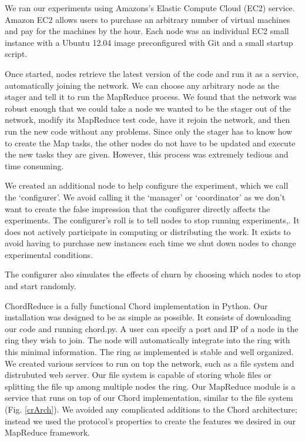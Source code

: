 \documentclass[10pt, conference, compsocconf]{IEEEtran}
\begin{document}
We ran our experiments using Amazons's Elastic Compute Cloud (EC2) service.  Amazon EC2 allows users to purchase an arbitrary number of virtual machines and pay for the machines by the hour. Each node was an individual EC2 small instance \cite{amazon-instances} with a Ubuntu 12.04 image preconfigured with Git and a small startup script.  

Once started, nodes retrieve the latest version of the code and run it as a service, automatically joining the network.  We can choose any arbitrary node as the stager and tell it to run the MapReduce process. We found that the network was robust enough that we could take a node we wanted to be the stager out of the network, modify its MapReduce test code, have it rejoin the network, and then run the new code without any problems. Since only the stager has to know how to create the Map tasks, the other nodes do not have to be updated and execute the new tasks they are given.  However, this process was extremely tedious and time consuming.

We created an additional node to help configure the experiment, which we call the `configurer'.  We avoid calling it the `manager' or `coordinator' as we don't want to create the false impression that the configurer directly affects the experiments.  The configurer's roll is to tell nodes to stop running experiments,.  It does not actively participate in computing or distributing the work.  It exists to avoid having to purchase new instances each time we  shut down nodes to change experimental conditions.

The configurer also simulates the effects of churn by choosing which nodes to stop and start randomly.  


ChordReduce is a fully functional Chord implementation in Python.  Our installation was designed to be as simple as possible.  It consists of downloading our code \cite{code} and running chord.py.  A user can specify a port and IP of a node in the ring they wish to join.  The node will automatically integrate into the ring with this minimal information.  The ring as implemented is stable and well organized.  We created various services to run on top the network, such as a file system and distrubuted web server.  Our file system is capable of storing whole files or splitting the file up among multiple nodes the ring.  Our MapReduce module is a service that runs on top of our Chord implementation, similar to the file system (Fig. \ref{crArch}).  We avoided any complicated additions to the Chord architecture; instead we used the protocol's properties to create the features we desired in our MapReduce framework. 
\end{document}
